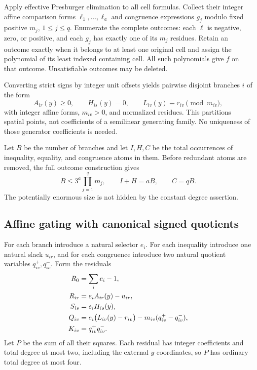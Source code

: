 \documentclass[11pt,letterpaper]{article}
\numberwithin{equation}{section}
\theoremstyle{definition}
\theoremstyle{remark}
\begin{document}
Apply effective Presburger elimination to all cell formulas. Collect their integer affine comparison forms $\ell_1,\ldots,\ell_a$ and congruence expressions $g_j$ modulo fixed positive $m_j$, $1\le j\le q$. Enumerate the complete outcomes: each $\ell$ is negative, zero, or positive, and each $g_j$ has exactly one of its $m_j$ residues. Retain an outcome exactly when it belongs to at least one original cell and assign the polynomial of its least indexed containing cell. All such polynomials give $f$ on that outcome. Unsatisfiable outcomes may be deleted.

Converting strict signs by integer unit offsets yields pairwise disjoint branches $i$ of the form
\begin{equation}\label{smc:og:eq:clauses}
 A_{ir}(y)\ge0,\qquad H_{is}(y)=0,\qquad
 L_{iv}(y)\equiv r_{iv}\pmod{m_{iv}},
\end{equation}
with integer affine forms, $m_{iv}>0$, and normalized residues. This partitions spatial points, not coefficients of a semilinear generating family. No uniqueness of those generator coefficients is needed.

Let $B$ be the number of branches and let $I,H,C$ be the total occurrences of inequality, equality, and congruence atoms in them. Before redundant atoms are removed, the full outcome construction gives
\[
 B\le3^a\prod_{j=1}^q m_j,\qquad I+H=aB,\qquad C=qB.
\]
The potentially enormous size is not hidden by the constant degree assertion.

\subsection{Affine gating with canonical signed quotients}
For each branch introduce a natural selector $e_i$. For each inequality introduce one natural slack $u_{ir}$, and for each congruence introduce two natural quotient variables $q_{iv}^+,q_{iv}^-$. Form the residuals
\begin{align}
 R_0&=\sum_i e_i-1,\notag\\
 R_{ir}&=e_iA_{ir}(y)-u_{ir},\notag\\
 S_{is}&=e_iH_{is}(y),\label{smc:og:eq:membership-residuals}\\
 Q_{iv}&=e_i\bigl(L_{iv}(y)-r_{iv}\bigr)
             -m_{iv}(q_{iv}^+-q_{iv}^-),\notag\\
 K_{iv}&=q_{iv}^+q_{iv}^-.\notag
\end{align}
Let $P$ be the sum of all their squares. Each residual has integer coefficients and total degree at most two, including the external $y$ coordinates, so $P$ has ordinary total degree at most four.
\end{document}
